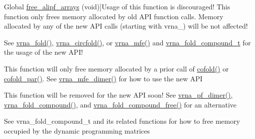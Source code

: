\begin{DoxyRefList}
\hypertarget{deprecated__deprecated000022}{}%
Global \hyperlink{group__consensus__pf__fold_ga0c0498f35686e26b38ee460d3db1a661}{free\+\_\+alipf\+\_\+arrays} (void)]Usage of this function is discouraged! This function only free\textquotesingle{}s memory allocated by old A\+PI function calls. Memory allocated by any of the new A\+PI calls (starting with vrna\+\_\+) will be not affected! 
\item[\label{deprecated__deprecated000073}%
\hypertarget{deprecated__deprecated000073}{}%
Global \hyperlink{group__mfe__fold__single_ga107fdfe5fd641868156bfd849f6866c7}{free\+\_\+arrays} (void)]See \hyperlink{group__mfe__fold__single_ga29a33b2895f4e67b0480271ff289afdc}{vrna\+\_\+fold()}, \hyperlink{group__mfe__fold__single_gaf973483d8acbc8cc9aacfc8a9b7f0074}{vrna\+\_\+circfold()}, or \hyperlink{group__mfe__fold_gabd3b147371ccf25c577f88bbbaf159fd}{vrna\+\_\+mfe()} and \hyperlink{group__fold__compound_ga1b0cef17fd40466cef5968eaeeff6166}{vrna\+\_\+fold\+\_\+compound\+\_\+t} for the usage of the new A\+P\+I! 
\item[\label{deprecated__deprecated000032}%
\hypertarget{deprecated__deprecated000032}{}%
Global \hyperlink{group__mfe__cofold_gaafb33d7473eb9af9d1b168ca8761c41a}{free\+\_\+co\+\_\+arrays} (void)]This function will only free memory allocated by a prior call of \hyperlink{group__mfe__cofold_gabc8517f22cfe70595ee81fc837910d52}{cofold()} or \hyperlink{group__mfe__cofold_ga7612cfeeb1b793f1e4179b1eb53df1f3}{cofold\+\_\+par()}. See \hyperlink{group__mfe__cofold_gaab22d10c1190f205f16a77cab9d5d3ee}{vrna\+\_\+mfe\+\_\+dimer()} for how to use the new A\+PI 
\item[\label{deprecated__deprecated000123}%
\hypertarget{deprecated__deprecated000123}{}%
Global \hyperlink{part__func__co_8h_ade3ce34ae8214811374b1d28a40dc247}{free\+\_\+co\+\_\+pf\+\_\+arrays} (void)]This function will be removed for the new A\+PI soon! See \hyperlink{group__pf__cofold_ga4e5c7d06c302a7c59fc0d64dc142ca63}{vrna\+\_\+pf\+\_\+dimer()}, \hyperlink{group__fold__compound_ga6601d994ba32b11511b36f68b08403be}{vrna\+\_\+fold\+\_\+compound()}, and \hyperlink{group__fold__compound_gadded6039d63f5d6509836e20321534ad}{vrna\+\_\+fold\+\_\+compound\+\_\+free()} for an alternative  
\item[\label{deprecated__deprecated000104}%
\hypertarget{deprecated__deprecated000104}{}%
Global \hyperlink{group__pf__fold_gae73db3f49a94f0f72e067ecd12681dbd}{free\+\_\+pf\+\_\+arrays} (void)]See vrna\+\_\+fold\+\_\+compound\+\_\+t and its related functions for how to free memory occupied by the dynamic programming matrices 

\end{DoxyRefList}
